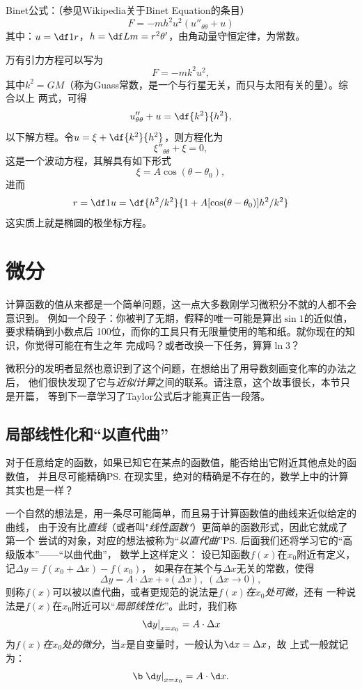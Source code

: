 \begin{shaded}
	Binet公式：（参见Wikipedia关于Binet Equation的条目）
	$$F=-mh^2u^2\left(u''_{\theta\theta}+u\right)$$
	其中：$u=\df1r$，$h=\df Lm=r^2\theta'$，由角动量守恒定律，为常数。
	
	万有引力方程可以写为
	$$F=-mk^2u^2,$$
	其中$k^2=GM$（称为{\kaishu Guass常数}，是一个与行星无关，而只与太阳有关的量）。综合以上
	两式，可得
	$$u''_{\theta\theta}+u=\df{k^2}{h^2},$$
	以下解方程。令$u=\xi+\df{k^2}{h^2}$，则方程化为
	$$\xi''_{\theta\theta}+\xi=0,$$
	这是一个波动方程，其解具有如下形式
	$$\xi=A\cos(\theta-\theta_0),$$
	进而
	$$r=\df1u=\df{h^2/k^2}{1+A[\cos(\theta-\theta_0)]h^2/k^2}$$
	这实质上就是椭圆的极坐标方程。
\end{shaded}

\section{微分}

计算函数的值从来都是一个简单问题，这一点大多数刚学习微积分不就的人都不会意识到。
例如一个段子：你被判了无期，假释的唯一可能是算出$\sin 1$的近似值，要求精确到小数点后
100位，而你的工具只有无限量使用的笔和纸。就你现在的知识，你觉得可能在有生之年
完成吗？或者改换一下任务，算算$\ln 3$？

微积分的发明者显然也意识到了这个问题，在想给出了用导数刻画变化率的办法之后，
他们很快发现了它与{\it 近似计算}之间的联系。请注意，这个故事很长，本节只是开篇，
等到下一章学习了Taylor公式后才能真正告一段落。

\subsection{局部线性化和“以直代曲”}

对于任意给定的函数，如果已知它在某点的函数值，能否给出它附近其他点处的函数值，
并且尽可能精确\ps{在现实里，绝对的精确是不存在的，数学上中的计算其实也是一样}？

一个自然的想法是，用一条尽可能简单，而且易于计算函数值的曲线来近似给定的曲线，
由于没有比{\it 直线}（或者叫"{\it 线性函数"}）更简单的函数形式，因此它就成了第一个
尝试的对象，对应的想法被称为“{\it 以直代曲}”\ps{后面我们还将学习它的“高级版本”——“以曲代曲”}，
数学上这样定义：
设已知函数$f(x)$在$x_0$附近有定义，记$\Delta y=f(x_0+\Delta x)-f(x_0)$，
如果存在某个与$\Delta x$无关的常数，使得
$$\Delta y=A\cdot\Delta x+\circ(\Delta x),\;(\Delta x\to 0),$$
则称$f(x)$可以被以直代曲，或者更规范的说法是{\it $f(x)$在$x_0$处可微}，还有
一种说法是$f(x)$在$x_0$附近可以“{\it 局部线性化}”。此时，我们称
$$\left.\d y\right|_{x=x_0}=A\cdot\Delta x$$
为{\it $f(x)$在$x_0$处的微分}，当$x$是自变量时，一般认为$\d x=\Delta x$，故
上式一般就记为：
$$\b\left.\d y\right|_{x=x_0}=A\cdot\d x.$$

